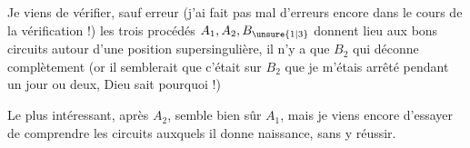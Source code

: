 
Je viens de vérifier, sauf erreur (j'ai fait pas mal d'erreurs encore dans le cours de la vérification !) les trois procédés $A_1,A_2,B_{\unsure{1|3}}$ donnent lieu aux bons circuits autour d'une position supersingulière, il n'y a que $B_2$ qui déconne complètement (or il semblerait que c'était sur $B_2$ que je m'étais arrêté pendant un jour ou deux, Dieu sait pourquoi !)

Le plus intéressant, après $A_2$, semble bien sûr $A_1$, mais je viens encore d'essayer de comprendre les circuits auxquels il donne naissance, sans y réussir.
